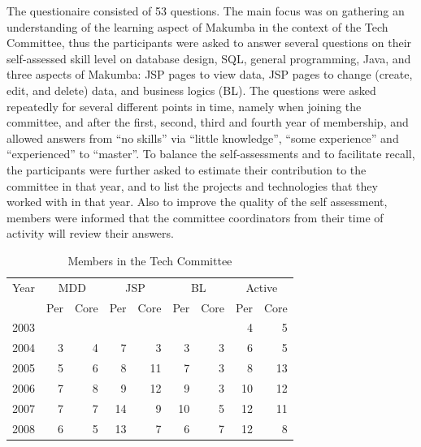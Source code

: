 \documentclass{llncs}
\begin{document}
The questionaire consisted of 53 questions. The main focus was on gathering an understanding of the learning aspect of Makumba in the context of the Tech Committee, thus the participants were asked to answer several questions on their self-assessed skill level on database design, SQL, general programming, Java, and three aspects of Makumba: JSP pages to view data, JSP pages to change (create, edit, and delete) data, and business logics (BL). The questions were asked repeatedly for several different points in time, namely when joining the committee, and after the first, second, third and fourth year of membership, and allowed answers from ``no skills'' via ``little knowledge'', ``some experience'' and ``experienced'' to ``master''. To balance the self-assessments and to facilitate recall, the participants were further asked to estimate their contribution to the committee in that year, and to list the projects and technologies that they worked with in that year. Also to improve the quality of the self assessment, members were informed that the committee coordinators from their time of activity will review their answers.


\begin{table}[t]
	\centering
	\begin{tabular}{c|r|r|r|r|r|r|r|r|}
		\hline
		\hline
		Year 		& \multicolumn{2}{c|}{MDD} & \multicolumn{2}{c|}{JSP}	& \multicolumn{2}{c|}{BL}	& \multicolumn{2}{c|}{Active}	\\
					& Per & Core				& Per & Core				& Per & Core				& Per & Core	\\
		\hline
		\hline
		2003 &   &   &   &   &   &   & 4 & 5 \\
		\hline
		2004 & 3 & 4 & 7 & 3 & 3 & 3 & 6 & 5 \\
		\hline
		2005 & 5 & 6 & 8 & 11 & 7 & 3 & 8 & 13 \\
		\hline
		2006 & 7 & 8 & 9 & 12 & 9 & 3 & 10 & 12 \\
		\hline
		2007 & 7 & 7 & 14 & 9 & 10 & 5 & 12 & 11 \\
		\hline
		2008 & 6 & 5 & 13 & 7 & 6 & 7 & 12 & 8 \\
		\hline
		\hline
	\end{tabular}
	\caption{Members in the Tech Committee}
	\label{tab:itd-members}
\end{table} 
\end{document}
